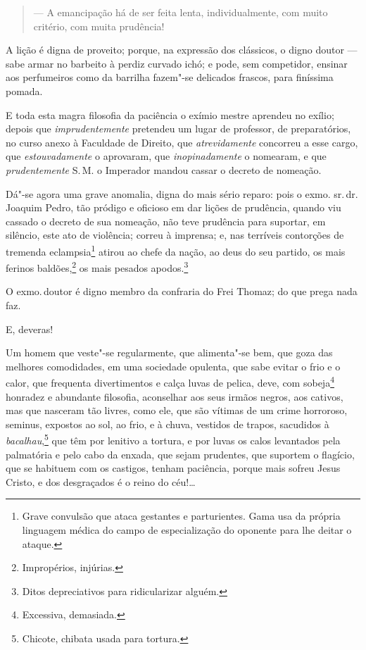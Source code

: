 \begin{quote}
--- A emancipação há de ser feita lenta, individualmente, com muito
critério, com muita prudência!
\end{quote}

A lição é digna de proveito; porque, na expressão dos clássicos, o digno
doutor --- sabe armar no barbeito à perdiz curvado ichó; e pode, sem
competidor, ensinar aos perfumeiros como da barrilha fazem"-se delicados
frascos, para finíssima pomada.

E toda esta magra filosofia da paciência o exímio mestre aprendeu no
exílio; depois que \emph{imprudentemente} pretendeu um lugar de
professor, de preparatórios, no curso anexo à Faculdade de Direito, que
\emph{atrevidamente} concorreu a esse cargo, que \emph{estouvadamente} o
aprovaram, que \emph{inopinadamente} o nomearam, e que
\emph{prudentemente} S.\,M. o Imperador mandou cassar o decreto de
nomeação.

Dá"-se agora uma grave anomalia, digna do mais sério reparo: pois o exmo.
sr.\,dr.\,Joaquim Pedro, tão pródigo e oficioso em dar lições de
prudência, quando viu cassado o decreto de sua nomeação, não teve
prudência para suportar, em silêncio, este ato de violência; correu à
imprensa; e, nas terríveis contorções de tremenda eclampsia\footnote{
  Grave convulsão que ataca gestantes e parturientes. Gama usa da
  própria linguagem médica do campo de especialização do oponente para
  lhe deitar o ataque.} atirou ao chefe da nação, ao deus do seu
partido, os mais ferinos baldões,\footnote{Impropérios, injúrias.} os
mais pesados apodos.\footnote{Ditos depreciativos para ridicularizar
  alguém.}

O exmo.\,doutor é digno membro da confraria do Frei Thomaz; do que prega
nada faz.

E, deveras!

Um homem que veste"-se regularmente, que alimenta"-se bem, que goza das
melhores comodidades, em uma sociedade opulenta, que sabe evitar o frio
e o calor, que frequenta divertimentos e calça luvas de pelica, deve,
com sobeja\footnote{Excessiva, demasiada.} honradez e abundante
filosofia, aconselhar aos seus irmãos negros, aos cativos, mas que
nasceram tão livres, como ele, que são vítimas de um crime horroroso,
seminus, expostos ao sol, ao frio, e à chuva, vestidos de trapos,
sacudidos à \emph{bacalhau},\footnote{Chicote, chibata usada para
  tortura.} que têm por lenitivo a tortura, e por luvas os calos
levantados pela palmatória e pelo cabo da enxada, que sejam prudentes,
que suportem o flagício, que se habituem com os castigos, tenham
paciência, porque mais sofreu Jesus Cristo, e dos desgraçados é o reino
do céu!\ldots{}

